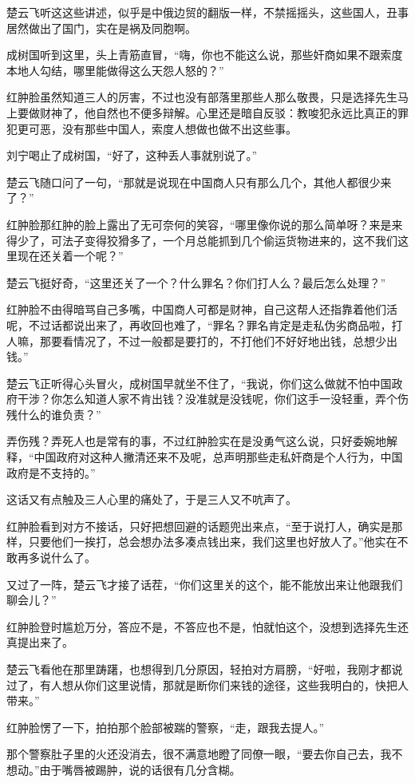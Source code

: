 楚云飞听这这些讲述，似乎是中俄边贸的翻版一样，不禁摇摇头，这些国人，丑事居然做出了国门，实在是祸及同胞啊。

成树国听到这里，头上青筋直冒，“嗨，你也不能这么说，那些奸商如果不跟索度本地人勾结，哪里能做得这么天怨人怒的？”

红肿脸虽然知道三人的厉害，不过也没有部落里那些人那么敬畏，只是选择先生马上要做财神了，他自然也不便多辩解。心里还是暗自反驳：教唆犯永远比真正的罪犯更可恶，没有那些中国人，索度人想做也做不出这些事。

刘宁喝止了成树国，“好了，这种丢人事就别说了。”

楚云飞随口问了一句，“那就是说现在中国商人只有那么几个，其他人都很少来了？”

红肿脸那红肿的脸上露出了无可奈何的笑容，“哪里像你说的那么简单呀？来是来得少了，可法子变得狡猾多了，一个月总能抓到几个偷运货物进来的，这不我们这里现在还关着一个呢？”

楚云飞挺好奇，“这里还关了一个？什么罪名？你们打人么？最后怎么处理？”

红肿脸不由得暗骂自己多嘴，中国商人可都是财神，自己这帮人还指靠着他们活呢，不过话都说出来了，再收回也难了，“罪名？罪名肯定是走私伪劣商品啦，打人嘛，那要看情况了，不过一般都是要打的，不打他们不好好地出钱，总想少出钱。”

楚云飞正听得心头冒火，成树国早就坐不住了，“我说，你们这么做就不怕中国政府干涉？你怎么知道人家不肯出钱？没准就是没钱呢，你们这手一没轻重，弄个伤残什么的谁负责？”

弄伤残？弄死人也是常有的事，不过红肿脸实在是没勇气这么说，只好委婉地解释，“中国政府对这种人撇清还来不及呢，总声明那些走私奸商是个人行为，中国政府是不支持的。”

这话又有点触及三人心里的痛处了，于是三人又不吭声了。

红肿脸看到对方不接话，只好把想回避的话题兜出来点，“至于说打人，确实是那样，只要他们一挨打，总会想办法多凑点钱出来，我们这里也好放人了。”他实在不敢再多说什么了。

又过了一阵，楚云飞才接了话茬，“你们这里关的这个，能不能放出来让他跟我们聊会儿？”

红肿脸登时尴尬万分，答应不是，不答应也不是，怕就怕这个，没想到选择先生还真提出来了。

楚云飞看他在那里踌躇，也想得到几分原因，轻拍对方肩膀，“好啦，我刚才都说过了，有人想从你们这里说情，那就是断你们来钱的途径，这些我明白的，快把人带来。”

红肿脸愣了一下，拍拍那个脸部被踹的警察，“走，跟我去提人。”

那个警察肚子里的火还没消去，很不满意地瞪了同僚一眼，“要去你自己去，我不想动。”由于嘴唇被踢肿，说的话很有几分含糊。

